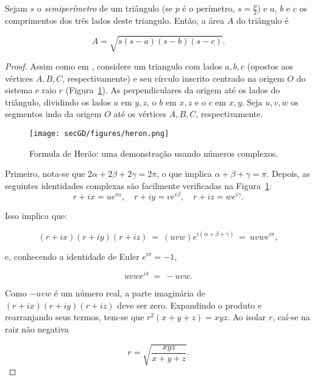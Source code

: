 \begin{teorema}
	Sejam $s$ o \emph{semiperímetro} de um triângulo (se $p$ é o perímetro, $s = \frac{p}{2}$) e $a$, $b$ e $c$ os comprimentos dos três lados deste triangulo. Então, a área $A$ do triângulo é
	
	\begin{equation}\tag{Fórmula de Herão}
		A = \sqrt{s(s-a)(s-b)(s-c)}.
		\label{eq:Herão}
	\end{equation}
	\begin{proof}
		Assim como em \cite{libertiSixGemsDGHistory}, considere um triangulo com lados $a,b,c$ (opostos aos vértices $A,B,C$, respectivamente) e seu círculo inscrito centrado na origem $O$ do sistema e raio $r$ (Figura~\ref{fig:heron}). As perpendiculares da origem até os lados do triângulo, dividindo os lados $a$ em $y,z$, o $b$ em $x,z$ e o $c$ em $x,y$. Seja $u,v,w$ os segmentos indo da origem $O$ até os vértices $A,B,C$, respectivamente.
		
		\begin{figure}[H]
			\begin{center}
				\texttt{[image: secGD/figures/heron.png]}
			\end{center}
			\caption{Formula de Herão: uma demonstração usando números complexos. \cite{libertiSixGemsDGHistory}}
			\label{fig:heron}
		\end{figure}
		
		\noindent Primeiro, nota-se que $2\alpha + 2\beta + 2\gamma = 2\pi$, o que implica $\alpha + \beta + \gamma = \pi$. Depois, as seguintes identidades complexas são facilmente verificadas na Figura~\ref{fig:heron}:
		$$ r+ix = ue^{i\alpha}, \quad r+iy = ve^{i\beta}, \quad r+iz = we^{i\gamma}.$$
		
		\noindent Isso implica que:
		
		$$(r+ix)(r+iy)(r+iz) \ =\ (uvw)e^{i(\alpha+\beta+\gamma)} \ =\ uvwe^{i\pi},$$
		
		\noindent e, conhecendo a identidade de Euler $e^{i\pi} = -1$, 
		
		$$uvwe^{i\pi} \ =\ -uvw.$$
		
		\noindent Como $-uvw$ é um número real, a parte imaginária de $(r+ix)(r+iy)(r+iz)$ deve ser zero. Expandindo o produto e rearranjando seus termos, tem-se que $r^2(x+y+z) = xyz$. Ao isolar $r$, caí-se na raiz não negativa
		
		\begin{equation}
			r = \sqrt{\frac{xyz}{x+y+z}}.
			\label{eq:herondemo}
		\end{equation}
		

\end{proof}
\end{teorema}
